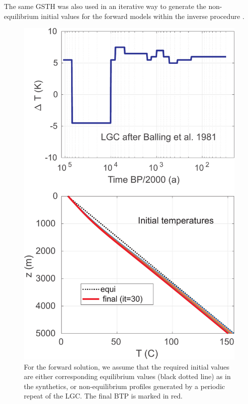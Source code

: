 \documentclass[cp]{copernicus}
\begin{document}
The same GSTH was also used in an iterative way to generate the non-equilibrium initial values for 
the forward models within the inverse procedure \citep{Rath2019a}. 


\begin{figure}%
 \centering
 \includegraphics[width=0.75\columnwidth]{Figures/SYNB_Initial_vert}
 \caption{For the forward solution, we assume that the required initial values are either 
corresponding equilibrium values (black dotted line) as in the synthetics, or non-equilibrium 
profiles generated by a periodic repeat of the LGC. The final BTP is marked in red.}
\label{fig:Initial}
\end{figure}
\end{document}
